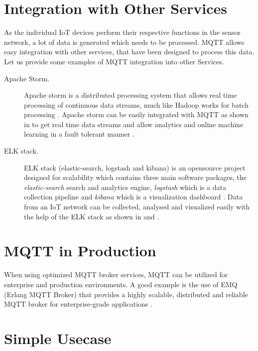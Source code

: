 \section{Integration with Other Services}

As the individual IoT devices perform their respective functions in
the sensor network, a lot of data is generated which needs to be
processed. MQTT allows easy integration with other services, that have
been designed to process this data. Let us provide some examples of
MQTT integration into other Services.

\begin{description}

\item[Apache Storm.] Apache storm is a distributed processing system
  that allows real time processing of continuous data streams, much
  like Hadoop works for batch processing \cite{apache-storm}. Apache
  storm can be easily integrated with MQTT as shown in
  \cite{apache-storm-mqtt} to get real time data streams and allow
  analytics and online machine learning in a fault tolerant manner
  \cite{apache-storm-wiki}.

\item [ELK stack.]  ELK stack (elastic-search, logstash and kibana) is
  an opensource project designed for scalability which contains three
  main software packages, the {\em elastic-search} search and
  analytics engine, {\em logstash} which is a data collection pipeline
  and {\em kibana} which is a visualization dashboard
  \cite{elk-stack}. Data from an IoT network can be collected,
  analysed and visualized easily with the help of the ELK stack as
  shown in \cite{mqtt-elasticsearch-setup} and
  \cite{kibana-mqtt-analysis}.


\end{description}

\section{MQTT in Production}

When using optimized MQTT broker services, MQTT can be utilized for
enterprise and production environments. A good example is the use of
EMQ (Erlang MQTT Broker) that provides a highly scalable, distributed
and reliable MQTT broker for enterprise-grade applications
\cite{erlang-mqtt-broker}.


\section{Simple Usecase}

